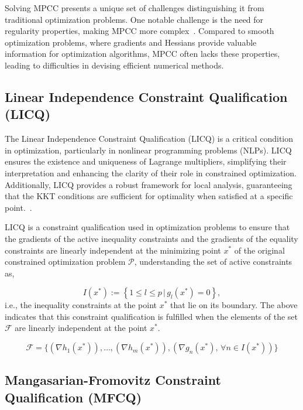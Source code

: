 Solving MPCC presents a unique set of challenges distinguishing it from traditional optimization problems. One notable challenge is the need for regularity properties, making MPCC more complex~\citep{MPCC_lack_properties}. Compared to smooth optimization problems, where gradients and Hessians provide valuable information for optimization algorithms, MPCC often lacks these properties, leading to difficulties in devising efficient numerical methods.

\subsection{Linear Independence Constraint Qualification (LICQ)}

The Linear Independence Constraint Qualification (LICQ) is a critical condition in optimization, particularly in nonlinear programming problems (NLPs). LICQ ensures the existence and uniqueness of Lagrange multipliers, simplifying their interpretation and enhancing the clarity of their role in constrained optimization. Additionally, LICQ provides a robust framework for local analysis, guaranteeing that the KKT conditions are sufficient for optimality when satisfied at a specific point.~\citep{Bergmann_Herzog_2019}.

LICQ is a constraint qualification used in optimization problems to ensure that the gradients of the active inequality constraints and the gradients of the equality constraints are linearly independent at the minimizing point $x^{*}$ of the original constrained optimization problem $\mathcal{P}$, understanding the set of active constraints as, 

\begin{equation} \label{eq:active_inequalities}
    I(x^*) := \left \{1 \leq l \leq p \,|\, g_l(x^*) = 0\right \}, 
\end{equation}
i.e., the inequality constraints at the point $x^{*}$ that lie on its boundary. The above indicates that this constraint qualification is fulfilled when the elements of the set $\mathcal{F}$ are linearly independent at the point $x^{*}$.

\begin{equation} \label{eq: LICQ }
     \mathcal{F} = \{ (\nabla h_1(x^*)), \ldots, (\nabla h_m(x^*)), (\nabla g_n(x^*), \, \forall n \in I(x^*)) \}    
\end{equation}

\subsection{Mangasarian-Fromovitz Constraint Qualification (MFCQ)}

